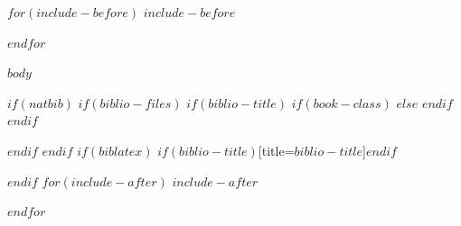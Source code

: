\documentclass[a4paper, 10pt]{article}
\begin{document}
$for(include-before)$
$include-before$

$endfor$

{
\newpage
\hypersetup{linkcolor=black}
\setcounter{tocdepth}{3}
\tableofcontents
}
\newpage

$body$

$if(natbib)$
$if(biblio-files)$
$if(biblio-title)$
$if(book-class)$
\renewcommand\bibname{$biblio-title$}
$else$
\renewcommand\refname{$biblio-title$}
$endif$
$endif$


$endif$
$endif$
$if(biblatex)$
\printbibliography$if(biblio-title)$[title=$biblio-title$]$endif$

$endif$
$for(include-after)$
$include-after$

$endfor$
\end{document}
